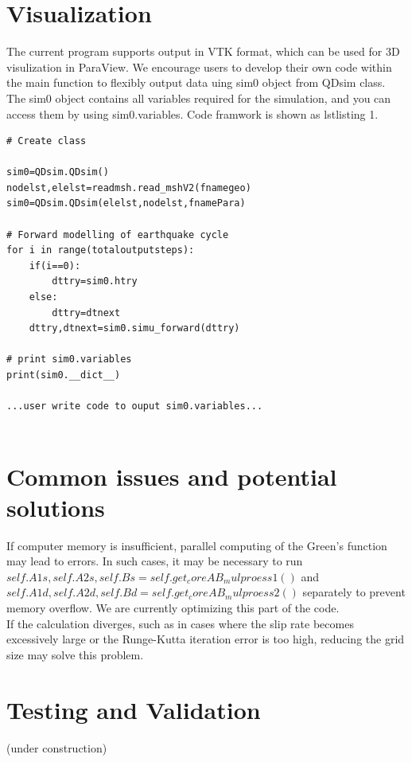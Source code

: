 \documentclass[a4paper,12pt]{article}
\begin{document}
\section{Visualization}
The current program supports output in VTK format, which can be used for 3D visulization in ParaView. We encourage users to develop their own code within the main function to flexibly output data uing sim0 object from QDsim class. The sim0 object contains all variables required for the simulation, and you can access them by using sim0.variables. Code framwork is shown as lstlisting 1.


\begin{lstlisting}[caption={Forward implementation and user-defined ouput code}, label={lst:module1}]
# Create class

sim0=QDsim.QDsim()
nodelst,elelst=readmsh.read_mshV2(fnamegeo)
sim0=QDsim.QDsim(elelst,nodelst,fnamePara)

# Forward modelling of earthquake cycle
for i in range(totaloutputsteps):
	if(i==0):
		dttry=sim0.htry
	else:
		dttry=dtnext
	dttry,dtnext=sim0.simu_forward(dttry)

# print sim0.variables
print(sim0.__dict__)

...user write code to ouput sim0.variables...
    
\end{lstlisting}

\section{Common issues and potential solutions}
If computer memory is insufficient, parallel computing of the Green's function may lead to errors. In such cases, it may be necessary to run $self.A1s, self.A2s, self.Bs = self.get_coreAB_mulproess1()$ and $self.A1d, self.A2d, self.Bd = self.get_coreAB_mulproess2()$ separately to prevent memory overflow. We are currently optimizing this part of the code.\\
If the calculation diverges, such as in cases where the slip rate becomes excessively large or the Runge-Kutta iteration error is too high, reducing the grid size may solve this problem.



\section{Testing and Validation}
(under construction)
\end{document}

